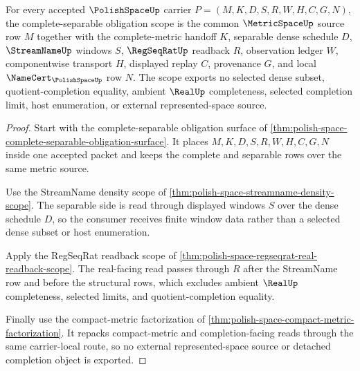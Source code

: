 \begin{theorem}
\label{thm:polishspace-complete-separable-obligation-scope}
For every accepted $\PolishSpaceUp$ carrier $P=(M,K,D,S,R,W,H,C,G,N)$, the complete-separable obligation scope is the common $\MetricSpaceUp$ source row $M$ together with the complete-metric handoff $K$, separable dense schedule $D$, $\StreamNameUp$ windows $S$, $\RegSeqRatUp$ readback $R$, observation ledger $W$, componentwise transport $H$, displayed replay $C$, provenance $G$, and local $\NameCert_{\PolishSpaceUp}$ row $N$. The scope exports no selected dense subset, quotient-completion equality, ambient $\RealUp$ completeness, selected completion limit, host enumeration, or external represented-space source.
\end{theorem}
\begin{proof}
Start with the complete-separable obligation surface of \autoref{thm:polish-space-complete-separable-obligation-surface}. It places $M,K,D,S,R,W,H,C,G,N$ inside one accepted packet and keeps the complete and separable rows over the same metric source.

Use the StreamName density scope of \autoref{thm:polish-space-streamname-density-scope}. The separable side is read through displayed windows $S$ over the dense schedule $D$, so the consumer receives finite window data rather than a selected dense subset or host enumeration.

Apply the RegSeqRat readback scope of \autoref{thm:polish-space-regseqrat-real-readback-scope}. The real-facing read passes through $R$ after the StreamName row and before the structural rows, which excludes ambient $\RealUp$ completeness, selected limits, and quotient-completion equality.

Finally use the compact-metric factorization of \autoref{thm:polish-space-compact-metric-factorization}. It repacks compact-metric and completion-facing reads through the same carrier-local route, so no external represented-space source or detached completion object is exported.
\end{proof}

